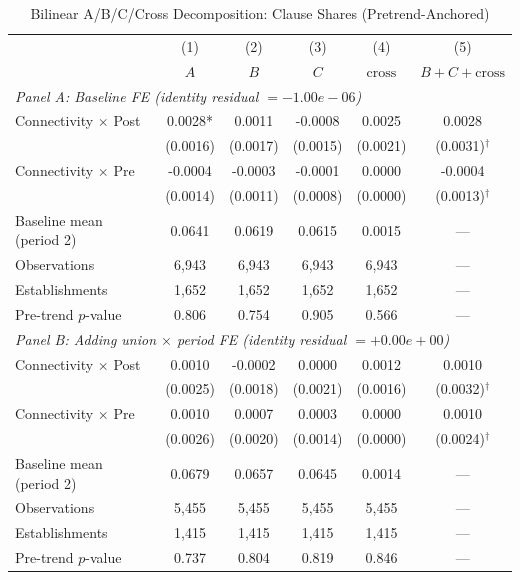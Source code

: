 \begin{table}[H]
\centering
\caption{Bilinear A/B/C/Cross Decomposition: Clause Shares (Pretrend-Anchored)}
\label{tab:dotprod_shares_decomposition}
\scriptsize
\setlength{\tabcolsep}{6pt}
\begin{tabular}{lccccc}
\hline\hline
 & (1) & (2) & (3) & (4) & (5) \\
 & \textbf{$A$} & \textbf{$B$} & \textbf{$C$} & \textbf{$\text{cross}$} & \textbf{$B{+}C{+}\text{cross}$} \\
\hline
\multicolumn{6}{l}{\textit{Panel A: Baseline FE \quad (identity residual $= -1.00e-06$)}} \\
Connectivity $\times$ Post & 0.0028* & 0.0011 & -0.0008 & 0.0025 & 0.0028 \\
 & (0.0016) & (0.0017) & (0.0015) & (0.0021) & (0.0031)$^\dagger$ \\
Connectivity $\times$ Pre & -0.0004 & -0.0003 & -0.0001 & 0.0000 & -0.0004 \\
 & (0.0014) & (0.0011) & (0.0008) & (0.0000) & (0.0013)$^\dagger$ \\
Baseline mean (period 2) & 0.0641 & 0.0619 & 0.0615 & 0.0015 & --- \\
Observations & 6,943 & 6,943 & 6,943 & 6,943 & --- \\
Establishments & 1,652 & 1,652 & 1,652 & 1,652 & --- \\
Pre-trend $p$-value & 0.806 & 0.754 & 0.905 & 0.566 & --- \\
\hline
\multicolumn{6}{l}{\textit{Panel B: Adding union $\times$ period FE \quad (identity residual $= +0.00e+00$)}} \\
Connectivity $\times$ Post & 0.0010 & -0.0002 & 0.0000 & 0.0012 & 0.0010 \\
 & (0.0025) & (0.0018) & (0.0021) & (0.0016) & (0.0032)$^\dagger$ \\
Connectivity $\times$ Pre & 0.0010 & 0.0007 & 0.0003 & 0.0000 & 0.0010 \\
 & (0.0026) & (0.0020) & (0.0014) & (0.0000) & (0.0024)$^\dagger$ \\
Baseline mean (period 2) & 0.0679 & 0.0657 & 0.0645 & 0.0014 & --- \\
Observations & 5,455 & 5,455 & 5,455 & 5,455 & --- \\
Establishments & 1,415 & 1,415 & 1,415 & 1,415 & --- \\
Pre-trend $p$-value & 0.737 & 0.804 & 0.819 & 0.846 & --- \\
\hline
\hline\hline
\end{tabular}

\end{table}

